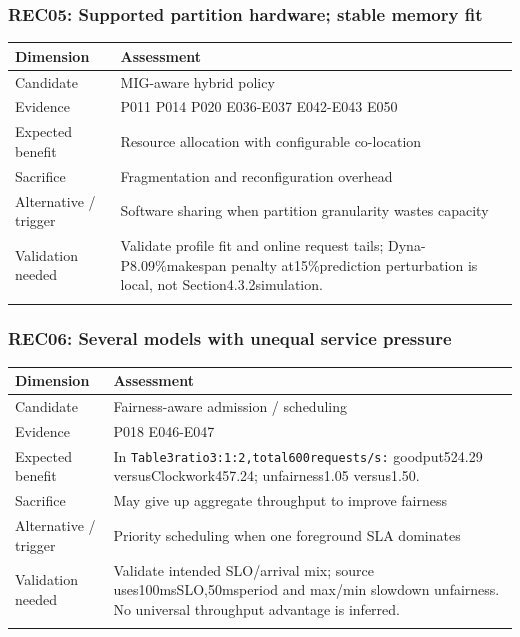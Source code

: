 \subsubsection*{REC05: Supported partition hardware; stable memory fit}
\begin{longtable}{>{\raggedright\arraybackslash}p{}>{\raggedright\arraybackslash}p{}}
\toprule
\textbf{Dimension} & \textbf{Assessment}\\\midrule\endhead
Candidate & MIG-aware hybrid policy\\\addlinespace
Evidence & P011 P014 P020 E036-E037 E042-E043 E050\\\addlinespace
Expected benefit & Resource allocation with configurable co-location\\\addlinespace
Sacrifice & Fragmentation and reconfiguration overhead\\\addlinespace
Alternative / trigger & Software sharing when partition granularity wastes capacity\\\addlinespace
Validation needed & Validate profile fit and online request tails; Dyna-P8.09\%makespan penalty at15\%prediction perturbation is local, not Section4.3.2simulation.\\\addlinespace
\bottomrule\end{longtable}
\subsubsection*{REC06: Several models with unequal service pressure}
\begin{longtable}{>{\raggedright\arraybackslash}p{}>{\raggedright\arraybackslash}p{}}
\toprule
\textbf{Dimension} & \textbf{Assessment}\\\midrule\endhead
Candidate & Fairness-aware admission / scheduling\\\addlinespace
Evidence & P018 E046-E047\\\addlinespace
Expected benefit & In \nolinkurl{Table3ratio3:1:2,total600requests/s:} goodput524.29 versusClockwork457.24; unfairness1.05 versus1.50.\\\addlinespace
Sacrifice & May give up aggregate throughput to improve fairness\\\addlinespace
Alternative / trigger & Priority scheduling when one foreground SLA dominates\\\addlinespace
Validation needed & Validate intended SLO/arrival mix; source uses100msSLO,50msperiod and max/min slowdown unfairness. No universal throughput advantage is inferred.\\\addlinespace
\bottomrule\end{longtable}
